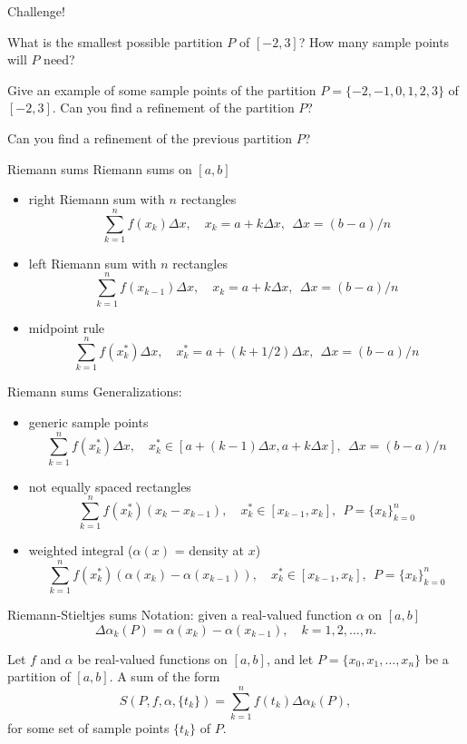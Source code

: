 \documentclass{beamer}
\begin{document}
\begin{frame}{Challenge!}
\begin{prob}
What is the smallest possible partition $P$ of $[-2,3]$?  How many sample points will $P$ need?
\end{prob}
\pause
\begin{prob}
Give an example of some sample points of the partition $P=\{-2,-1,0,1,2,3\}$ of $[-2,3]$.
Can you find a refinement of the partition $P$?
\end{prob}
\pause
\begin{prob}
Can you find a refinement of the previous partition $P$?
\end{prob}
\end{frame}

\begin{frame}{Riemann sums}
Riemann sums on $[a,b]$
\begin{itemize}
\pause
\item right Riemann sum with $n$ rectangles
$$\sum_{k=1}^n f(x_k)\Delta x,\quad x_k = a+k\Delta x,\ \ \Delta x = (b-a)/n$$
\pause
\item left Riemann sum with $n$ rectangles
$$\sum_{k=1}^n f(x_{k-1})\Delta x,\quad x_k = a+k\Delta x,\ \ \Delta x = (b-a)/n$$
\pause
\item midpoint rule
$$\sum_{k=1}^n f(x_{k}^*)\Delta x,\quad x_k^* = a+(k+1/2)\Delta x,\ \ \Delta x = (b-a)/n$$
\end{itemize}
\end{frame}

\begin{frame}{Riemann sums}
Generalizations: 
\begin{itemize}
\pause
\item generic sample points
$$\sum_{k=1}^n f(x_k^*)\Delta x,\quad x_k^* \in [a+(k-1)\Delta x,a+k\Delta x],\ \ \Delta x = (b-a)/n$$
\pause
\item not equally spaced rectangles
$$\sum_{k=1}^n f(x_k^*)(x_k-x_{k-1}),\quad x_k^*\in [x_{k-1},x_k],\ \ P = \{x_k\}_{k=0}^n$$
\pause
\item weighted integral ($\alpha(x)$ = density at $x$)
$$\sum_{k=1}^n f(x_k^*)(\alpha(x_k)-\alpha(x_{k-1})),\quad x_k^*\in [x_{k-1},x_k],\ \ P = \{x_k\}_{k=0}^n$$
\end{itemize}
\end{frame}

\begin{frame}{Riemann-Stieltjes sums}
Notation: given a real-valued function $\alpha$ on $[a,b]$\\
$$\Delta \alpha_k(P) = \alpha(x_k)-\alpha(x_{k-1}),\quad k=1,2,\dots,n.$$
\pause
\begin{defn}
\pause
Let $f$ and $\alpha$ be real-valued functions on $[a,b]$, and let $P = \{x_0,x_1,\dots,x_n\}$ be a partition of $[a,b]$.
\pause
A sum of the form
$$S(P,f,\alpha,\{t_k\}) = \sum_{k=1}^n f(t_k) \Delta\alpha_k(P),$$
for some set of sample points $\{t_k\}$ of $P$.
\end{defn}
\end{frame}
\end{document}
